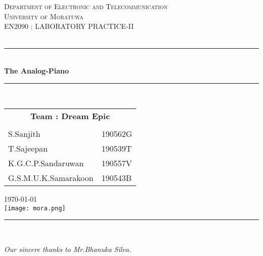 \documentclass[class=article,crop=false]{standalone}
\newcommand{\HRule}{\rule{\linewidth}{0.2mm}}
\begin{document}
\begin{titlepage}

    \center

    \textsc{\Large Department of Electronic and Telecommunication}\\[.4cm]
    \textsc{\Large University of Moratuwa}\\[1cm]

    \textsc{\Large EN2090 : LABORATORY PRACTICE-II}\\[0.2cm]
    \textsc{\large }\\[1cm] 										%
    \HRule \\[0.8cm]
    { \LARGE \bfseries The Analog-Piano}\\[0.7cm]
    \HRule \\[1.5cm]
    \large
    \begin{center}
        \begin{tabular}{l l}
            \multicolumn{2}{c}{\textbf{Team : Dream Epic}} \\\\
            S.Sanjith  & 190562G \\
            T.Sajeepan & 190539T \\
            K.G.C.P.Sandaruwan  & 190557V \\
            G.S.M.U.K.Samarakoon & 190543B \\
        \end{tabular}
    \end{center}
\vspace*{1cm}
    {\large \today}\\[1cm]
    \texttt{[image: mora.png]}\\[3cm] 	
    \HRule\\
    \begin{flushleft}
        \vspace*{-.2cm}
        \emph{Our sincere thanks to Mr.Bhanuka Silva.}
    \end{flushleft}
    \vfill
\end{titlepage}
\end{document}
